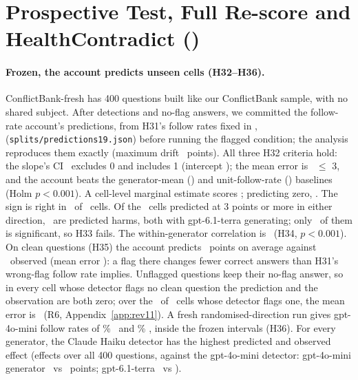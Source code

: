 

\clearpage
\section{Prospective Test, Full Re-score and HealthContradict ()}
\label{app:fresh}
\paragraph{Frozen, the account predicts unseen cells (H32--H36).} ConflictBank-fresh has 400 questions
built like our ConflictBank sample, with no shared subject. After detections and no-flag answers, we
committed the follow-rate account's predictions, from H31's follow rates fixed in ,
(\texttt{splits/predictions19.json}) before running the flagged condition; the analysis reproduces them exactly (maximum
drift \frDrift\ points). All three H32 criteria hold: the slope's CI \frSlopeCI\ excludes 0 and includes 1 (intercept
\frIntercept); the mean error is \frMae\ $\le$ 3, and the account beats the generator-mean (\frMaeGen) and
unit-follow-rate (\frMaeOnes) baselines (Holm $p<0.001$). A cell-level marginal estimate scores \frMaeMarg;
predicting zero, \frMaeZero. The sign is right in \frSignAgree\ of \frN\ cells. Of the \frBigN\ cells predicted at
3 points or more in either direction, \frHarmN\ are predicted harms, both with gpt-6.1-terra generating; only
\frHarmConf\ of them is significant, so H33 fails. The within-generator correlation is \frRWithin\ (H34, $p<0.001$).
On clean questions (H35) the account predicts \frCleanPred\ points on average against \frCleanObs\ observed (mean
error \frCleanMae): a flag there changes fewer correct answers than H31's wrong-flag follow rate implies. Unflagged
questions keep their no-flag answer, so in every cell whose detector flags no clean question the prediction and the
observation are both zero; over the \acctCleanNFlag\ of \acctCleanNAll\ cells whose detector flags one, the mean error
is \acctCleanMaeFlag\ (R6, Appendix~\ref{app:rev11}). A fresh randomised-direction run gives
gpt-4o-mini follow rates of \frFollowR\% \frFollowRCI\ and \frFollowW\% \frFollowWCI, inside the frozen
intervals (H36). For every generator, the Claude Haiku detector has the highest predicted and observed effect
(effects over all 400 questions, against the gpt-4o-mini detector: gpt-4o-mini generator \frSelMiniObs\ vs \frMiniDetMiniObs\ points; gpt-6.1-terra
\frSelTerraObs\ vs \frMiniDetTerraObs).


